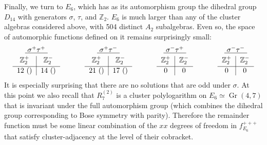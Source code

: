 \documentclass[11pt]{article}
\DeclareMathOperator{\Gr}{Gr}
\begin{document}
Finally, we turn to $E_6$, which has as its automorphism group the dihedral group $D_{14}$ with generators $\sigma$, $\tau$, and $\mathbb{Z}_2$. $E_6$ is much larger than any of the cluster algebras considered above, with 504 distinct $A_2$ subalgebras. Even so, the space of automorphic functions defined on it remains surprisingly small:
\begin{equation}
\begin{tabular}{ c | c |}
\multicolumn{2}{c}{$\underline{\ \sigma^+ \tau^+\ }$} \\[-1em]
\multicolumn{1}{c}{} & \multicolumn{1}{c}{} \\
 $\mathbb{Z}_2^+$ & \multicolumn{1}{c}{$\mathbb{Z}_2^-$} \\[-1em]
 & \multicolumn{1}{c}{} \\
\hline
12 () & \multicolumn{1}{c}{14 () }
\end{tabular} 
\hspace{1.2cm}
\begin{tabular}{ c | c |}
\multicolumn{2}{c}{$\underline{\ \sigma^+ \tau^- \ }$} \\[-1em]
\multicolumn{1}{c}{} & \multicolumn{1}{c}{} \\
 $\mathbb{Z}_2^+$ & \multicolumn{1}{c}{$\mathbb{Z}_2^-$} \\[-1em]
 & \multicolumn{1}{c}{} \\
\hline
21 () & \multicolumn{1}{c}{17 ()}
\end{tabular} 
\hspace{1.2cm}
\begin{tabular}{ c | c |}
\multicolumn{2}{c}{$\underline{\ \sigma^- \tau^+ \ }$} \\[-1em]
\multicolumn{1}{c}{} & \multicolumn{1}{c}{} \\
 $\mathbb{Z}_2^+$ & \multicolumn{1}{c}{$\mathbb{Z}_2^-$} \\[-1em]
 & \multicolumn{1}{c}{} \\
\hline
0 & \multicolumn{1}{c}{0} 
\end{tabular} 
\hspace{1.2cm}
\begin{tabular}{ c | c |}
\multicolumn{2}{c}{$\underline{\ \sigma^- \tau^- \ }$} \\[-1em]
\multicolumn{1}{c}{} & \multicolumn{1}{c}{} \\
 $\mathbb{Z}_2^+$ & \multicolumn{1}{c}{$\mathbb{Z}_2^-$} \\[-1em]
 & \multicolumn{1}{c}{} \\
\hline
0 & \multicolumn{1}{c}{0}
\end{tabular} 
\end{equation}
It is especially surprising that there are no solutions that are odd under $\sigma$. At this point we also recall that $R^{(2)}_7$ is a cluster polylogarithm on $E_6\simeq \Gr(4,7)$ that is invariant under the full automorphism group (which combines the dihedral group corresponding to Bose symmetry with parity). Therefore the remainder function must be some linear combination of the $xx$ degrees of freedom in $f_{E_6}^{+++}$ that satisfy cluster-adjacency at the level of their cobracket. 
\end{document}
